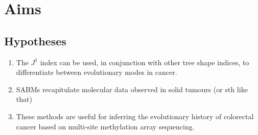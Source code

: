 \section{Aims}

\subsection{Hypotheses}
\begin{enumerate}
    \item The $J^1$ index can be used, in conjunction with other tree shape
        indices, to differentiate between evolutionary modes in cancer.
    \item SABMs recapitulate molecular data observed in solid tumours (or sth
        like that)
    \item These methods are useful for inferring the evolutionary history of
        colorectal cancer based on multi-site methylation array sequencing.
\end{enumerate}

